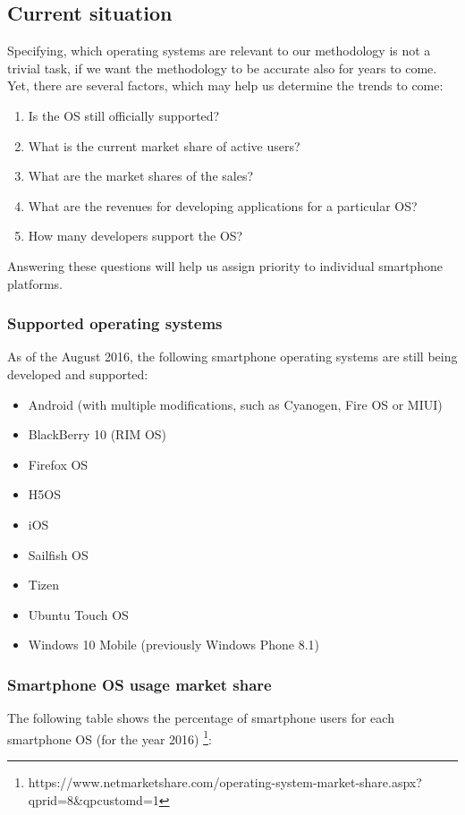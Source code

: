 \documentclass[english,master,public,dept460,male,cpdeclaration,oneside]{diploma}
\begin{document}
\subsection{Current situation}
Specifying, which operating systems are relevant to our methodology is not a trivial task, if we want the methodology to be accurate also for years to come. Yet, there are several factors, which may help us determine the trends to come:
\begin{enumerate}
	\item Is the OS still officially supported?
	\item What is the current market share of active users?
	\item What are the market shares of the sales?
	\item What are the revenues for developing applications for a particular OS?
	\item How many developers support the OS?
\end{enumerate}
Answering these questions will help us assign priority to individual smartphone platforms. 

\subsubsection{Supported operating systems}
As of the August 2016, the following smartphone operating systems are still being developed and supported: 
\begin{itemize}
	\item Android (with multiple modifications, such as Cyanogen, Fire OS or MIUI)
	\item BlackBerry 10 (RIM OS)
	\item Firefox OS
	\item H5OS
	\item iOS
	\item Sailfish OS
	\item Tizen
	\item Ubuntu Touch OS
	\item Windows 10 Mobile (previously Windows Phone 8.1)
\end{itemize}

\subsubsection{Smartphone OS usage market share}
The following table shows the percentage of smartphone users for each smartphone OS (for the year 2016) \footnote{https://www.netmarketshare.com/operating-system-market-share.aspx?qprid=8\&qpcustomd=1}:
\end{document}

